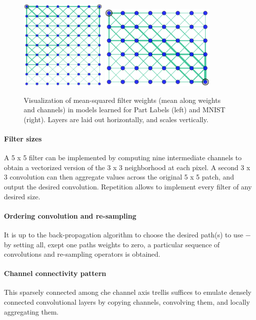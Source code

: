 \documentclass[a4paper,twocolumn]{article}
\begin{document}
\begin{figure}[t]
    \centering
    \includegraphics[width=0.375\textwidth]{fabrics2.png}
    \hskip 1cm 
    \includegraphics[width=0.5\textwidth]{fabrics3.png}
    \caption{Visualization of mean-squared filter weights (mean along weights and channels) in models learned for Part Labels (left) and MNIST (right). Layers are laid out horizontally, and scales vertically.}
\end{figure}

\paragraph{Filter sizes}
A 5 x 5 filter can be implemented by computing nine intermediate channels to obtain a vectorized version of the 3 x 3 neighborhood at each pixel. A second 3 x 3 convolution can then aggregate values across the original 5 x 5 patch, and output the desired convolution. Repetition allows to implement every filter of any desired size.

\paragraph{Ordering convolution and re-sampling}
It is up to the back-propagation algorithm to choose the desired path(s) to use $-$ by setting all, exept one paths weights to zero, a particular sequence of convolutions and re-sampling operators is obtained.

\paragraph{Channel connectivity pattern}
This sparsely connected among che channel axis trellis suffices to emulate densely connected convolutional layers by copying channels, convolving them, and locally aggregating them.
\end{document}
